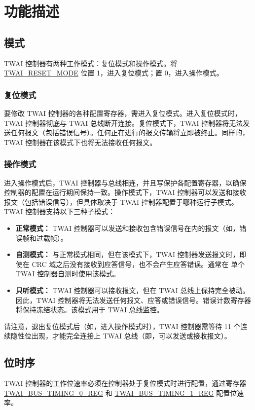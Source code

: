 \documentclass[main\_\_CN.tex]{subfiles}
\begin{document}
\section{功能描述}

\subsection{模式}
\label{sec:twai-modes}
\chipname{} TWAI 控制器有两种工作模式：复位模式和操作模式。将 \hyperref[fielddesc:TWAIRESETMODE]{TWAI\_RESET\_MODE} 位置 1，进入复位模式；置 0，进入操作模式。

\subsubsection{复位模式}
要修改 TWAI 控制器的各种配置寄存器，需进入复位模式。进入复位模式时，TWAI 控制器彻底与 TWAI 总线断开连接。复位模式下，TWAI 控制器将无法发送任何报文（包括错误信号）。任何正在进行的报文传输将立即被终止。同样的，TWAI 控制器在该模式下也将无法接收任何报文。

\subsubsection{操作模式}
进入操作模式后，TWAI 控制器与总线相连，并且写保护各配置寄存器，以确保控制器的配置在运行期间保持一致。操作模式下，TWAI 控制器可以发送和接收报文（包括错误信号），但具体取决于 TWAI 控制器配置于哪种运行子模式。TWAI 控制器支持以下三种子模式：

\begin{itemize}
    \item {\bfseries 正常模式：} TWAI 控制器可以发送和接收包含错误信号在内的报文（如，错误帧和过载帧）。
    \item {\bfseries 自测模式：} 与正常模式相同，但在该模式下，TWAI 控制器发送报文时，即使在 CRC 域之后没有接收到应答信号，也不会产生应答错误。通常在 单个 TWAI 控制器自测时使用该模式。
    \item {\bfseries 只听模式：} TWAI 控制器可以接收报文，但在 TWAI 总线上保持完全被动。因此，TWAI 控制器将无法发送任何报文、应答或错误信号。错误计数寄存器将保持冻结状态。该模式用于 TWAI 总线监控。
\end{itemize}

请注意，退出复位模式后（如，进入操作模式时），TWAI 控制器需等待 11 个连续隐性位出现，才能完全连接上 TWAI 总线（即，可以发送或接收报文）。

\subsection{位时序}
TWAI 控制器的工作位速率必须在控制器处于复位模式时进行配置，通过寄存器 \\\hyperref[regdesc:TWAIBUSTIMING0REG]{TWAI\_BUS\_TIMING\_0\_REG} 和 \hyperref[regdesc:TWAIBUSTIMING1REG]{TWAI\_BUS\_TIMING\_1\_REG} 配置位速率。
\end{document}
